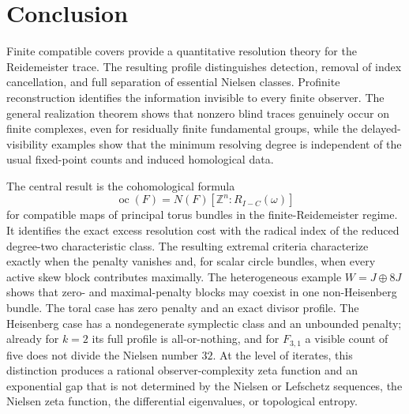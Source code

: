 \documentclass[11pt]{article}
\DeclareMathOperator{\oc}{oc}
\newcommand{\Z}{\mathbb Z}
\begin{document}
\section{Conclusion}

Finite compatible covers provide a quantitative resolution theory for the
Reidemeister trace.  The resulting profile distinguishes detection, removal
of index cancellation, and full separation of essential Nielsen classes.
Profinite reconstruction identifies the information invisible to every
finite observer.  The general realization theorem shows that nonzero blind
traces genuinely occur on finite complexes, even for residually finite
fundamental groups, while the delayed-visibility examples show that the
minimum resolving degree is independent of the usual fixed-point counts and
induced homological data.

The central result is the cohomological formula
\[
  \oc(F)=N(F)[\Z^n:R_{I-C}(\omega)]
\]
for compatible maps of principal torus bundles in the finite-Reidemeister
regime.  It identifies the exact
excess resolution cost with the radical index of the reduced degree-two
characteristic class.  The resulting extremal criteria characterize exactly
when the penalty vanishes and, for scalar circle bundles, when every active
skew block contributes maximally.  The heterogeneous example
$W=J\oplus8J$ shows that zero- and maximal-penalty blocks may coexist in one
non-Heisenberg bundle.  The toral case has zero penalty and an exact divisor
profile.  The Heisenberg case has a nondegenerate symplectic class and an
unbounded penalty; already for $k=2$ its full profile is all-or-nothing, and
for $F_{3,1}$ a visible count of five does not divide the Nielsen number
$32$.  At the level of iterates, this distinction produces a
rational observer-complexity zeta function and an exponential gap that is not
determined by the Nielsen or Lefschetz sequences, the Nielsen zeta function,
the differential eigenvalues, or topological entropy.
\end{document}

